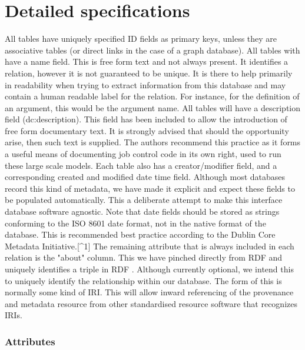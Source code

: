 \documentclass[
]{article}
\begin{document}
\section{Detailed specifications}\label{detailed-specifications}

All tables have uniquely specified ID fields as primary keys, unless
they are associative tables (or direct links in the case of a graph
database). All tables with have a name field. This is free form text and
not always present. It identifies a relation, however it is not
guaranteed to be unique. It is there to help primarily in readability
when trying to extract information from this database and may contain a
human readable label for the relation. For instance, for the definition
of an argument, this would be the argument name. All tables will have a
description field (dc:description). This field has been included to
allow the introduction of free form documentary text. It is strongly
advised that should the opportunity arise, then such text is supplied.
The authors recommend this practice as it forms a useful means of
documenting job control code in its own right, used to run these large
scale models. Each table also has a creator/modifier field, and a
corresponding created and modified date time field. Although most
databases record this kind of metadata, we have made it explicit and
expect these fields to be populated automatically. This a deliberate
attempt to make this interface database software agnostic. Note that
date fields should be stored as strings conforming to the ISO 8601 date
format, not in the native format of the database. This is recommended
best practice according to the Dublin Core Metadata
Initiative.{[}\^{}1{]} The remaining attribute that is always included
in each relation is the "about" column. This we have pinched directly
from RDF and uniquely identifies a triple in RDF
\citep{hartig2010publishing}. Although currently optional, we intend
this to uniquely identify the relationship within our database. The form
of this is normally some kind of IRI. This will allow inward referencing
of the provenance and metadata resource from other standardised resource
software that recognizes IRIs.

\subsubsection{Attributes}\label{attributes}
\end{document}
